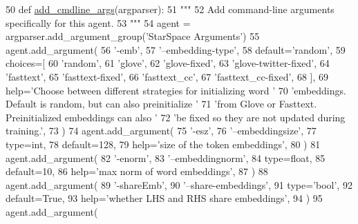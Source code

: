 \begin{DoxyCode}
50     \textcolor{keyword}{def }\hyperlink{namespaceparlai_1_1agents_1_1drqa_1_1config_a62fdd5554f1da6be0cba185271058320}{add\_cmdline\_args}(argparser):
51         \textcolor{stringliteral}{"""}
52 \textcolor{stringliteral}{        Add command-line arguments specifically for this agent.}
53 \textcolor{stringliteral}{        """}
54         agent = argparser.add\_argument\_group(\textcolor{stringliteral}{'StarSpace Arguments'})
55         agent.add\_argument(
56             \textcolor{stringliteral}{'-emb'},
57             \textcolor{stringliteral}{'--embedding-type'},
58             default=\textcolor{stringliteral}{'random'},
59             choices=[
60                 \textcolor{stringliteral}{'random'},
61                 \textcolor{stringliteral}{'glove'},
62                 \textcolor{stringliteral}{'glove-fixed'},
63                 \textcolor{stringliteral}{'glove-twitter-fixed'},
64                 \textcolor{stringliteral}{'fasttext'},
65                 \textcolor{stringliteral}{'fasttext-fixed'},
66                 \textcolor{stringliteral}{'fasttext\_cc'},
67                 \textcolor{stringliteral}{'fasttext\_cc-fixed'},
68             ],
69             help=\textcolor{stringliteral}{'Choose between different strategies for initializing word '}
70             \textcolor{stringliteral}{'embeddings. Default is random, but can also preinitialize '}
71             \textcolor{stringliteral}{'from Glove or Fasttext. Preinitialized embeddings can also '}
72             \textcolor{stringliteral}{'be fixed so they are not updated during training.'},
73         )
74         agent.add\_argument(
75             \textcolor{stringliteral}{'-esz'},
76             \textcolor{stringliteral}{'--embeddingsize'},
77             type=int,
78             default=128,
79             help=\textcolor{stringliteral}{'size of the token embeddings'},
80         )
81         agent.add\_argument(
82             \textcolor{stringliteral}{'-enorm'},
83             \textcolor{stringliteral}{'--embeddingnorm'},
84             type=float,
85             default=10,
86             help=\textcolor{stringliteral}{'max norm of word embeddings'},
87         )
88         agent.add\_argument(
89             \textcolor{stringliteral}{'-shareEmb'},
90             \textcolor{stringliteral}{'--share-embeddings'},
91             type=\textcolor{stringliteral}{'bool'},
92             default=\textcolor{keyword}{True},
93             help=\textcolor{stringliteral}{'whether LHS and RHS share embeddings'},
94         )
95         agent.add\_argument(

\end{DoxyCode}
